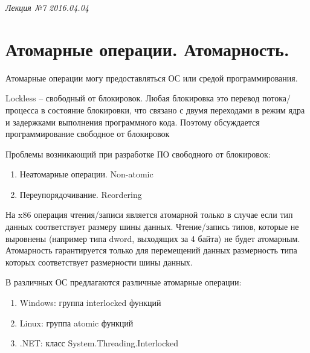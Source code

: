 \clearpage
\begin{flushright}
	\textit{Лекция №7}
	\textit{2016.04.04}
\end{flushright}

\section{Атомарные операции. Атомарность.}

Атомарные операции могу предоставляться ОС или средой программирования.

Lockless – свободный от блокировок. Любая блокировка это перевод потока/процесса в состояние блокировки, что связано с двумя переходами в режим ядра и задержками выполнения программного кода. Поэтому обсуждается программирование свободное от блокировок \cite{Dawson_Lockless}

Проблемы возникающий при разработке ПО свободного от блокировок:
\begin{enumerate}
	\item Неатомарные операции. Non-atomic
	\item Переупорядочивание. Reordering
\end{enumerate}

На x86 операция чтения/записи является атомарной только в случае если тип данных соответствует размеру шины данных. Чтение/запись типов,  которые не выровнены (например типа dword, выходящих за 4 байта) не будет атомарным. Атомарность гарантируется только для перемещений данных размерность типа которых соответствует размерности шины данных.

В различных ОС предлагаются различные атомарные операции:
\begin{enumerate}
	\item Windows: группа interlocked функций
	\item Linux: группа atomic функций
	\item .NET: класс System.Threading.Interlocked
\end{enumerate}

